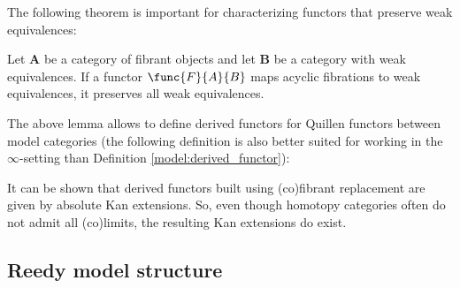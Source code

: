     The following theorem is important for characterizing functors that preserve weak equivalences:
    \begin{theorem}\label{model:ken_brown}
        Let $\mathbf{A}$ be a category of fibrant objects and let $\mathbf{B}$ be a category with weak equivalences. If a functor $\func{F}{A}{B}$ maps acyclic fibrations to weak equivalences, it preserves all weak equivalences.
    \end{theorem}

    The above lemma allows to define derived functors for Quillen functors between model categories (the following definition is also better suited for working in the $\infty$-setting than Definition \ref{model:derived_functor}):
    \begin{property}\label{model:absolute_derived_functors}
        It can be shown that derived functors built using (co)fibrant replacement are given by absolute Kan extensions. So, even though homotopy categories often do not admit all (co)limits, the resulting Kan extensions do exist.
    \end{property}

\subsection{Reedy model structure}

